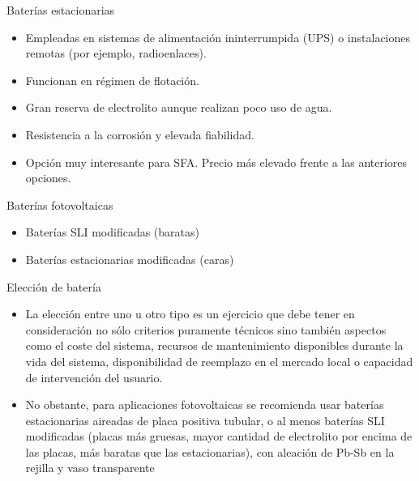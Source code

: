 \documentclass[xcolor={usenames,svgnames,dvipsnames}]{beamer}
\begin{document}
\begin{frame}[label=sec-2-6-4]{Baterías estacionarias}
\begin{itemize}
\item Empleadas en sistemas de alimentación ininterrumpida (UPS) o instalaciones remotas (por ejemplo, radioenlaces).

\item Funcionan en régimen de flotación.

\item Gran reserva de electrolito aunque realizan poco uso de agua.

\item Resistencia a la corrosión y elevada fiabilidad.

\item Opción muy interesante para SFA. Precio más elevado frente a las anteriores opciones.
\end{itemize}
\end{frame}

\begin{frame}[label=sec-2-6-5]{Baterías \guillemotleft{}fotovoltaicas\guillemotright{}}
\begin{itemize}
\item Baterías SLI modificadas (baratas)

\item Baterías estacionarias modificadas (caras)
\end{itemize}
\end{frame}

\begin{frame}[label=sec-2-6-6]{Elección de batería}
\begin{itemize}
\item La elección entre uno u otro tipo es un ejercicio que debe tener en consideración no sólo \alert{criterios puramente técnicos} sino también aspectos como el \alert{coste del sistema}, recursos de \alert{mantenimiento} disponibles durante la vida del sistema, \alert{disponibilidad de reemplazo} en el mercado local o capacidad de intervención del usuario.

\item No obstante, \alert{para aplicaciones fotovoltaicas se recomienda usar baterías estacionarias aireadas de placa positiva tubular, o al menos baterías SLI modificadas} (placas más gruesas, mayor cantidad de electrolito por encima de las placas, más baratas que las estacionarias), con aleación de Pb-Sb en la rejilla y vaso transparente
\end{itemize}
\end{frame}
\end{document}
